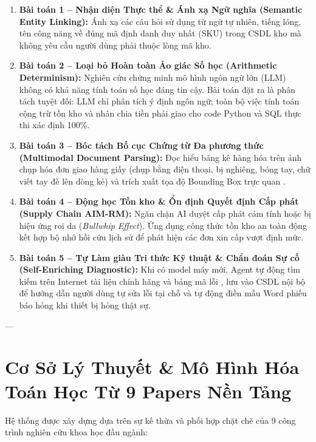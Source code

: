 \documentclass[11pt,a4paper]{article}
\begin{document}
\begin{enumerate}[leftmargin=1.8em]
    \item \textbf{Bài toán 1 -- Nhận diện Thực thể \& Ánh xạ Ngữ nghĩa (Semantic Entity Linking):} Ánh xạ các câu hỏi sử dụng từ ngữ tự nhiên, tiếng lóng, tên công năng về đúng mã định danh duy nhất (SKU) trong CSDL kho mà không yêu cầu người dùng phải thuộc lòng mã kho.
    \item \textbf{Bài toán 2 -- Loại bỏ Hoàn toàn Ảo giác Số học (Arithmetic Determinism):} Nghiên cứu \cite{hallucinationtax2026} chứng minh mô hình ngôn ngữ lớn (LLM) không có khả năng tính toán số học đáng tin cậy. Bài toán đặt ra là phân tách tuyệt đối: LLM chỉ phân tích ý định ngôn ngữ; toàn bộ việc tính toán cộng trừ tồn kho và nhân chia tiền phải giao cho code Python và SQL thực thi xác định 100\%.
    \item \textbf{Bài toán 3 -- Bóc tách Bố cục Chứng từ Đa phương thức (Multimodal Document Parsing):} Đọc hiểu bảng kê hàng hóa trên ảnh chụp hóa đơn giao hàng giấy (chụp bằng điện thoại, bị nghiêng, bóng tay, chữ viết tay đè lên dòng kẻ) và trích xuất tọa độ Bounding Box trực quan \cite{qwen25vl2026}.
    \item \textbf{Bài toán 4 -- Động học Tồn kho \& Ổn định Quyết định Cấp phát (Supply Chain AIM-RM):} Ngăn chặn AI duyệt cấp phát cảm tính hoặc bị hiệu ứng roi da (\textit{Bullwhip Effect}). Ứng dụng công thức tồn kho an toàn động kết hợp bộ nhớ hồi cứu lịch sử \cite{supplychain2026} để phát hiện các đơn xin cấp vượt định mức.
    \item \textbf{Bài toán 5 -- Tự Làm giàu Tri thức Kỹ thuật \& Chẩn đoán Sự cố (Self-Enriching Diagnostic):} Khi có model máy mới, Agent tự động tìm kiếm trên Internet tài liệu chính hãng và bảng mã lỗi \cite{toolformer2023}, lưu vào CSDL nội bộ để hướng dẫn người dùng tự sửa lỗi tại chỗ và tự động điền mẫu Word phiếu báo hỏng khi thiết bị hỏng thật sự.
\end{enumerate}

---

\section{Cơ Sở Lý Thuyết \& Mô Hình Hóa Toán Học Từ 9 Papers Nền Tảng}

Hệ thống được xây dựng dựa trên sự kế thừa và phối hợp chặt chẽ của 9 công trình nghiên cứu khoa học đầu ngành:
\end{document}
